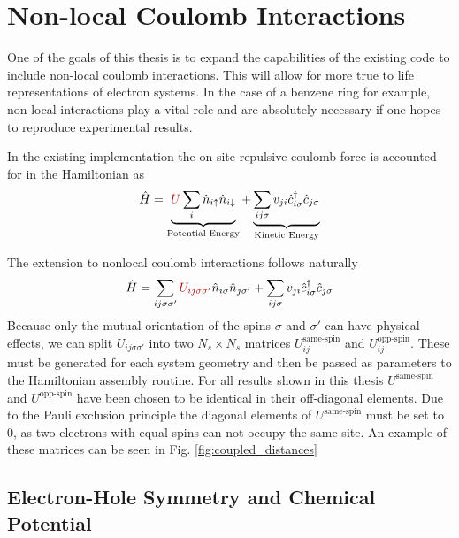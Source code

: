 \section{Non-local Coulomb Interactions} \label{sec:non_local_coulomb}

One of the goals of this thesis is to expand the capabilities of the existing code to include non-local coulomb interactions. This will allow for more true to life representations of electron systems. In the case of a benzene ring for example, non-local interactions play a vital role and are absolutely necessary if one hopes to reproduce experimental results. 

\bigskip

In the existing implementation the on-site repulsive coulomb force is accounted for in the Hamiltonian as
\begin{equation}
    \hat{H}=\underbrace{{\color{red!70!black} U} \sum_{i} \hat{n}_{i \uparrow} \hat{n}_{i \downarrow}}_{\text{Potential Energy}}+%
    \underbrace{\sum_{i j \sigma} v_{j i} \hat{c}_{i \sigma}^{\dagger} \hat{c}_{j \sigma}}_{\text{Kinetic Energy}}\label{eq:local_ham_nonsym}
\end{equation}

 The extension to nonlocal coulomb interactions follows naturally
 \begin{equation}
    \hat{H}= \sum_{ij\sigma\sigma'}{\color{red!70!black} U_{ij\sigma\sigma'}}\hat{n}_{i \sigma} \hat{n}_{j\sigma'}+%
    \sum_{i j \sigma} v_{j i} \hat{c}_{i \sigma}^{\dagger} \hat{c}_{j \sigma}%
    \label{eq:ham_nonsym}
\end{equation}
Because only the mutual orientation of the spins $\sigma$ and $\sigma'$ can have physical effects, we can split $U_{ij\sigma\sigma'}$ into two $N_s\times N_s$ matrices $U_{ij}^{\text{same-spin}}$ and $U_{ij}^{\text{opp-spin}}$. These must be generated for each system geometry and then be passed as parameters to the Hamiltonian assembly routine. For all results shown in this thesis $U^{\text{same-spin}}$ and $U^{\text{opp-spin}}$ have been chosen to be identical in their off-diagonal elements. Due to the Pauli exclusion principle the diagonal elements of $U^{\text{same-spin}}$ must be set to $0$, as two electrons with equal spins can not occupy the same site. An example of these matrices can be seen in Fig. \ref{fig:coupled_distances}


\subsection{Electron-Hole Symmetry and Chemical Potential} \label{sec:electron_hole_symmetry}
